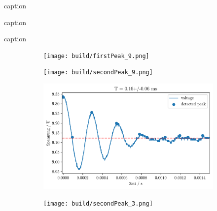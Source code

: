\begin{table}[h]
	\centering
	\caption{caption}
	\label{tab:label}
	\begin{subtable}[t]{0.4\textwidth}
	\centering
	\caption{caption}
		
	\end{subtable}
	\begin{subtable}[t]{0.4\textwidth}
	\centering
	\caption{caption}
		
	\end{subtable}
\end{table}

\begin{figure}[h]
	\centering
	\begin{subfigure}[c]{0.45\textwidth}
	\begin{center}
		\texttt{[image: build/firstPeak\_9.png]}
	\end{center}
	\caption{}
	\label{fig:}
	\end{subfigure}
	\begin{subfigure}[c]{0.45\textwidth}
	\begin{center}
		\texttt{[image: build/secondPeak\_9.png]}
	\end{center}
	\caption{}
	\label{fig:}
	\end{subfigure}

	\begin{subfigure}[c]{0.45\textwidth}
	\begin{center}
		\includegraphics[width=\textwidth]{picture/firstPeak_3.png}
	\end{center}
	\caption{}
	\label{fig:}
	\end{subfigure}
	\begin{subfigure}[c]{0.45\textwidth}
	\begin{center}
		\texttt{[image: build/secondPeak\_3.png]}
	\end{center}
	\caption{}
	\label{fig:}
	\end{subfigure}
	\caption{}
	\label{fig:}
\end{figure}

